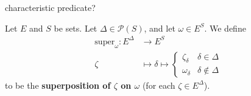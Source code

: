\begin{definition}
   \label{def:product-probability-measure}
   \leanok
   
   characteristic predicate?
\end{definition}

\begin{definition}[Superposition]
    \label{def:superposition}
    \leanok
    Let $E$ and $S$ be sets. Let $\Delta\in\mathcal{P}(S)$, and let $\omega\in E^S$. We define
    \begin{align*}
        \text{super}_\omega:E^\Delta&\to E^S\\
        \zeta&\mapsto \delta\mapsto\begin{cases}
            \zeta_\delta & \delta\in\Delta\\
            \omega_\delta & \delta\notin\Delta
        \end{cases}
    \end{align*}
    to be the \textbf{superposition of $\zeta$ on $\omega$} (for each $\zeta\in E^\Delta$).
\end{definition}
